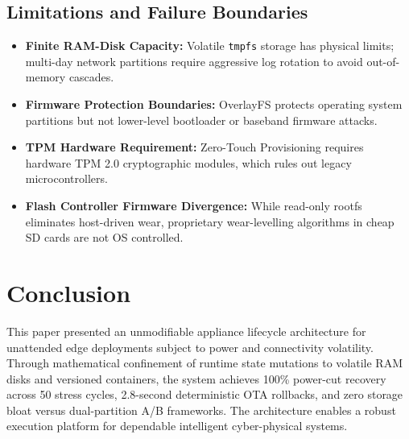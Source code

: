 \documentclass[conference]{IEEEtran}
\begin{document}
\subsection{Limitations and Failure Boundaries}
\begin{itemize}
    \item \textbf{Finite RAM-Disk Capacity:} Volatile \texttt{tmpfs} storage has physical limits; multi-day network partitions require aggressive log rotation to avoid out-of-memory cascades.
    \item \textbf{Firmware Protection Boundaries:} OverlayFS protects operating system partitions but not lower-level bootloader or baseband firmware attacks.
    \item \textbf{TPM Hardware Requirement:} Zero-Touch Provisioning requires hardware TPM 2.0 cryptographic modules, which rules out legacy microcontrollers.
    \item \textbf{Flash Controller Firmware Divergence:} While read-only rootfs eliminates host-driven wear, proprietary wear-levelling algorithms in cheap SD cards are not OS controlled.
\end{itemize}

\section{Conclusion}
This paper presented an unmodifiable appliance lifecycle architecture for unattended edge deployments subject to power and connectivity volatility. Through mathematical confinement of runtime state mutations to volatile RAM disks and versioned containers, the system achieves 100\% power-cut recovery across 50 stress cycles, 2.8-second deterministic OTA rollbacks, and zero storage bloat versus dual-partition A/B frameworks. The architecture enables a robust execution platform for dependable intelligent cyber-physical systems.
\end{document}
